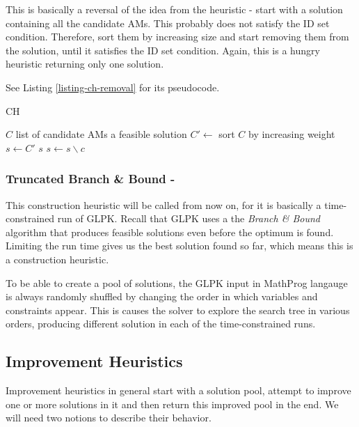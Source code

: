 This is basically a reversal of the idea from the  heuristic - start with a solution containing all the candidate AMs. This probably does not satisfy the ID set condition. Therefore, sort them by increasing size and start removing them from the solution, until it satisfies the ID set condition. Again, this is a hungry heuristic returning only one solution.

See Listing \ref{listing-ch-removal} for its pseudocode.

\begin{algorithm}
\caption{ CH}
\label{listing-ch-removal}
\begin{algorithmic}
\REQUIRE $C$ list of candidate AMs
\ENSURE a feasible solution
\STATE $C' \gets $ sort $C$ by increasing weight
\STATE $s \gets C'$
    \RETURN $s$
  \ENDIF
  \STATE $s \gets s \backslash c$
\ENDFOR
\end{algorithmic}
\end{algorithm}

\subsubsection{Truncated Branch \& Bound - }

This construction heuristic will be called  from now on, for it is basically a time-constrained run of GLPK. Recall that GLPK uses a the \textit{Branch \& Bound} algorithm that produces feasible solutions even before the optimum is found. Limiting the run time gives us the best solution found so far, which means this is a construction heuristic.

To be able to create a pool of solutions, the GLPK input in MathProg langauge is always randomly shuffled by changing the order in which variables and constraints appear. This is causes the solver to explore the search tree in various orders, producing different solution in each of the time-constrained runs.

\subsection{Improvement Heuristics}
\label{section-mip-ihs}


Improvement heuristics in general start with a solution pool, attempt to improve one or more solutions in it and then return this improved pool in the end. We will need two notions to describe their behavior.

